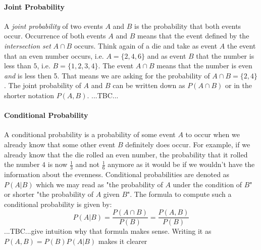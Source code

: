 \paragraph{Joint Probability}
A \emph{joint probability} of two events $A$ and $B$ is the probability that both events occur. Occurrence of both events $A$ and $B$ means that the event defined by the \emph{intersection set} $A \cap B$ occurs. Think again of a die and take as event $A$ the event that an even number occurs, i.e. $A = \{2,4,6\}$ and as event $B$ that the number is less than $5$, i.e. $B = \{1,2,3,4\}$. The event $A \cap B$ means that the number is even \emph{and} is less then 5. That means we are asking for the probability of $A \cap B = \{2,4\}$. The joint probability of $A$ and $B$ can be written down as $P(A \cap B)$ or in the shorter notation $P(A,B)$. ...TBC...





\paragraph{Conditional Probability}
A conditional probability is a probability of some event $A$ to occur when we already know that some other event $B$ definitely does occur. For example, if we already know that the die rolled an even number, the probability that it rolled the number $4$ is now $\frac{1}{3}$ and not $\frac{1}{6}$ anymore as it would be if we wouldn't have the information about the evenness. Conditional probabilities are denoted as $P(A|B)$ which we may read as "the probability of $A$ under the condition of $B$" or shorter "the probability of $A$ given $B$". The formula to compute such a conditional probability is given by:
\begin{equation}
\label{Eq:ConditionalProbability}
 P(A|B) = \frac{P(A \cap B)}{P(B)} = \frac{P(A, B)}{P(B)}
\end{equation}
...TBC...give intuition why that formula makes sense. Writing it as $P(A,B) = P(B) P(A|B)$ makes it clearer


